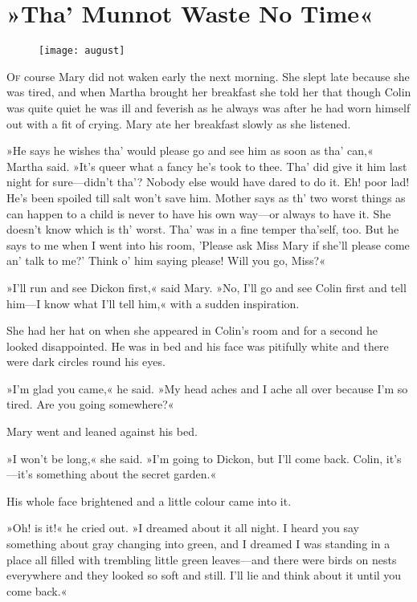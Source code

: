 \chapter{»Tha' Munnot Waste No Time«} 
	
\begin{figure}[t!]
\centering
\texttt{[image: august]}
\end{figure}

	\lettrine[lines=6]{O}{f} course Mary did not waken early the next morning. She slept late because she was tired, and when Martha brought her breakfast she told her that though Colin was quite quiet he was ill and feverish as he always was after he had worn himself out with a fit of crying. Mary ate her breakfast slowly as she listened.

»He says he wishes tha' would please go and see him as soon as tha' can,« Martha said. »It's queer what a fancy he's took to thee. Tha' did give it him last night for sure—didn't tha'? Nobody else would have dared to do it. Eh! poor lad! He's been spoiled till salt won't save him. Mother says as th' two worst things as can happen to a child is never to have his own way—or always to have it. She doesn't know which is th' worst. Tha' was in a fine temper tha'self, too. But he says to me when I went into his room, 'Please ask Miss Mary if she'll please come an' talk to me?' Think o' him saying please! Will you go, Miss?«

»I'll run and see Dickon first,« said Mary. »No, I'll go and see Colin first and tell him—I know what I'll tell him,« with a sudden inspiration.

She had her hat on when she appeared in Colin's room and for a second he looked disappointed. He was in bed and his face was pitifully white and there were dark circles round his eyes.

»I'm glad you came,« he said. »My head aches and I ache all over because I'm so tired. Are you going somewhere?«

Mary went and leaned against his bed.

»I won't be long,« she said. »I'm going to Dickon, but I'll come back. Colin, it's—it's something about the secret garden.«

His whole face brightened and a little colour came into it.

»Oh! is it!« he cried out. »I dreamed about it all night. I heard you say something about gray changing into green, and I dreamed I was standing in a place all filled with trembling little green leaves—and there were birds on nests everywhere and they looked so soft and still. I'll lie and think about it until you come back.«

